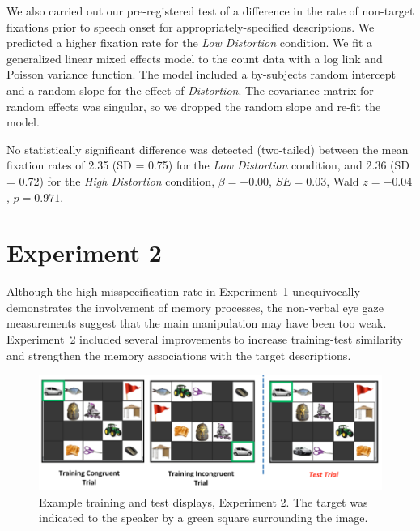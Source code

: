 \documentclass[natbib,doc,a4paper]{apa6}
\begin{document}
We also carried out our pre-registered test of a difference in the rate of non-target fixations prior to speech onset for appropriately-specified descriptions. We predicted a higher fixation rate for the \emph{Low Distortion} condition. We fit a generalized linear mixed effects model to the count data with a log link and Poisson variance function. The model included a by-subjects random intercept and a random slope for the effect of \emph{Distortion}. The covariance matrix for random effects was singular, so we dropped the random slope and re-fit the model. 

No statistically significant difference was detected (two-tailed) between the mean fixation rates of 
2.35 (SD = 0.75) for the \emph{Low Distortion} condition, and
2.36 (SD = 0.72) for the \emph{High Distortion} condition,
\(\beta = -0.00\), \(SE = 0.03\), Wald \(z = -0.04\), \(p = 0.971\).

\section*{Experiment 2}
\label{sec:orgb2c36af}
Although the high misspecification rate in Experiment~1 unequivocally demonstrates the involvement of memory processes, the non-verbal eye gaze measurements suggest that the main manipulation may have been too weak. Experiment~2 included several improvements to increase training-test similarity and strengthen the memory associations with the target descriptions.

\begin{figure}[htbp]
\centering
\includegraphics[width=.9\linewidth]{figs/Exp2_overview.png}
\caption{\label{fig:orgd53e75c}
Example training and test displays, Experiment 2. The target was indicated to the speaker by a green square surrounding the image.}
\end{figure}
\end{document}
